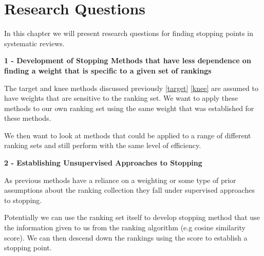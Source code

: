 \chapter{Research Questions} \label{rq}

In this chapter we will present research questions for finding stopping points in systematic reviews.

\textbf{1 - Development of Stopping Methods that have less dependence on finding a weight that is specific to a given set of rankings} \label{sm}

The target and knee methods discussed previously \ref{target} \ref{knee} are assumed to have weights that are sensitive to the ranking set. We want to apply these methods to our own ranking set using the same weight that was established for these methods. 

We then want to look at methods that could be applied to a range of different ranking sets and still perform with the same level of efficiency. 

\textbf{2 - Establishing Unsupervised Approaches to Stopping} \label{sm}

As previous methods have a reliance on a weighting or some type of prior assumptions about the ranking collection they fall under supervised approaches to stopping.

Potentially we can use the ranking set itself to develop stopping method that use the information given to us from the ranking algorithm (e.g cosine similarity score). We can then descend down the rankings using the score to establish a stopping point.